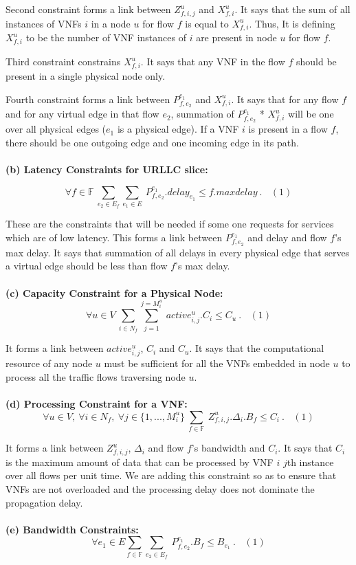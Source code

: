 \documentclass{article}
\begin{document}
Second constraint forms a link between \(Z_{f,i,j}^u\) and \(X_{f,i}^u\). It says that the sum of all instances of VNFs \(i\) in a node \(u\) for flow \(f\) is equal to \(X_{f,i}^u\). Thus, It is defining \(X_{f,i}^u\) to be the number of VNF instances of \(i\) are present in node \(u\) for flow \(f\).

Third constraint constrains \(X_{f,i}^u\). It says that any VNF in the flow \(f\) should be present in a single physical node only.

Fourth constraint forms a link between \(P_{f,e_2}^{e_1}\) and \(X_{f,i}^u\). It says that for any flow \(f\) and for any virtual edge in that flow \(e_2\), summation of \(P_{f,e_2}^{e_1}\) * \(X_{f,i}^u\) will be one over all physical edges (\(e_1\) is a physical edge). If a VNF \(i\) is present in a flow \(f\), there should be one outgoing edge and one incoming edge in its path.\\
\\
\textbf{(b) Latency Constraints for URLLC slice:}

\[\forall{f \in \mathbb{F}}\ \sum_{e_2 \in E_f} \sum_{e_1\in E} \ P_{f,e_2}^{e_1}.delay_{e_1} \leq f.max delay\ .\ \ \ \ (1)\]

These are the constraints that will be needed if some one requests for services which are of low latency. This forms a link between \(P_{f,e_2}^{e_1}\) and delay and flow \(f\)'s max delay. It says that summation of all delays in every physical edge that serves a virtual edge should be less than flow \(f\)'s max delay.\\
\\
\textbf{(c) Capacity Constraint for a Physical Node:}
\[\forall{u\in V}\ \sum_{i \in N_f}\sum_{j=1}^{j=M_i^u} \ active_{i,j}^u.C_i \leq C_u\ .\ \ \ \ (1)\]

It forms a link between \(active_{i,j}^u\), \(C_i\) and \(C_u\). It says that the computational resource of any node \(u\) must be sufficient for all the VNFs embedded in node \(u\) to process all the traffic flows traversing node \(u\).\\
\\
\textbf{(d) Processing Constraint for a VNF:}
\[\forall{u\in V},\ \forall{i\in N_f},\ \forall{j\in \{1,...,M_i^u\}}\ \sum_{f \in \mathbb{F}} \ Z_{f,i,j}^u.\Delta_i.B_f \leq C_i\ .\ \ \ \ (1)\] 

It forms a link between \(Z_{f,i,j}^u\), \(\Delta_i\) and flow \(f\)'s bandwidth and \(C_i\). It says that \(C_i\) is the maximum amount of data that can be processed by VNF \(i\) \(j\)th instance over all flows per unit time. We are adding this constraint so as to ensure that VNFs are not overloaded and the processing delay does not dominate the propagation delay.\\
\\
\textbf{(e) Bandwidth Constraints:}
\[\forall{e_1\in E} \sum_{f \in \mathbb{F}} \sum_{e_2 \in E_f} \ P_{f,e_2}^{e_1}.B_f \leq B_{e_1}\ .\ \ \ \ (1)\]
\end{document}
